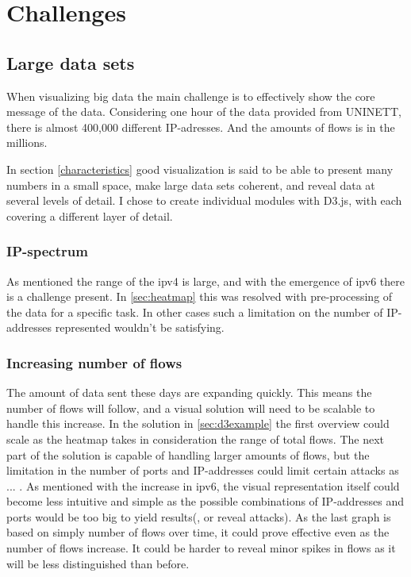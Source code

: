 \chapter{Challenges}
\label{chp:challenges} 
\section{Large data sets}
When visualizing big data the main challenge is to effectively show the core message of the data. Considering one hour of the data provided from UNINETT, there is almost 400,000 different IP-adresses. And the amounts of flows is in the millions. 

In section \ref{characteristics} good visualization is said to be able to present many numbers in a small space,  make large data sets coherent, and reveal data at several levels of detail. I chose to create individual modules with D3.js, with each covering a different layer of detail. 

\subsection{IP-spectrum}
As mentioned the range of the \gls{ipv4} is large, and with the emergence of \gls{ipv6} there is a challenge present. In \ref{sec:heatmap} this was resolved with pre-processing of the data for a specific task. In other cases such a limitation on the number of IP-addresses represented wouldn't be satisfying.  

\subsection{Increasing number of flows}
The amount of data sent these days are expanding quickly. This means the number of flows will follow, and a visual solution will need to be scalable to handle this increase. In the solution in \ref{sec:d3example} the first overview could scale as the heatmap takes in consideration the range of total flows. 
The next part of the solution is capable of handling larger amounts of flows, but the limitation in the number of ports and IP-addresses could limit certain attacks as ... . As mentioned with the increase in \gls{ipv6}, the visual representation itself could become less intuitive and simple as the possible combinations of IP-addresses and ports would be too big to yield results(, or reveal attacks). 
As the last graph is based on simply number of flows over time, it could prove effective even as the number of flows increase. It could be harder to reveal minor spikes in flows as it will be less distinguished than before. 


